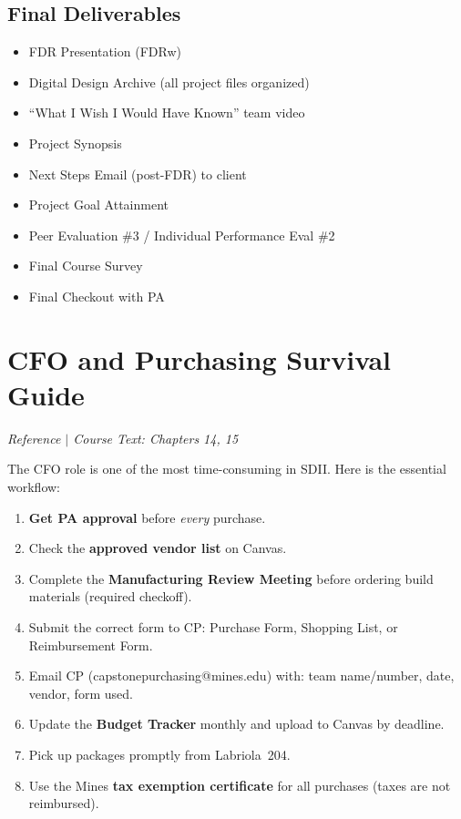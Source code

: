 \documentclass[11pt,letterpaper]{article}
\begin{document}
\subsection{Final Deliverables}
\begin{itemize}[nosep,leftmargin=1.5em]
\item FDR Presentation (FDRw)
\item Digital Design Archive (all project files organized)
\item ``What I Wish I Would Have Known'' team video
\item Project Synopsis
\item Next Steps Email (post-FDR) to client
\item Project Goal Attainment
\item Peer Evaluation \#3 / Individual Performance Eval \#2
\item Final Course Survey
\item Final Checkout with PA
\end{itemize}


\section{CFO and Purchasing Survival Guide}
\textit{Reference $|$ Course Text: Chapters 14, 15}

The CFO role is one of the most time-consuming in SDII. Here is the essential workflow:

\begin{enumerate}[nosep,leftmargin=1.5em]
\item \textbf{Get PA approval} before \emph{every} purchase.
\item Check the \textbf{approved vendor list} on Canvas.
\item Complete the \textbf{Manufacturing Review Meeting} before ordering build materials (required checkoff).
\item Submit the correct form to CP: Purchase Form, Shopping List, or Reimbursement Form.
\item Email CP (capstonepurchasing@mines.edu) with: team name/number, date, vendor, form used.
\item Update the \textbf{Budget Tracker} monthly and upload to Canvas by deadline.
\item Pick up packages promptly from Labriola~204.
\item Use the Mines \textbf{tax exemption certificate} for all purchases (taxes are not reimbursed).
\end{enumerate}
\end{document}
